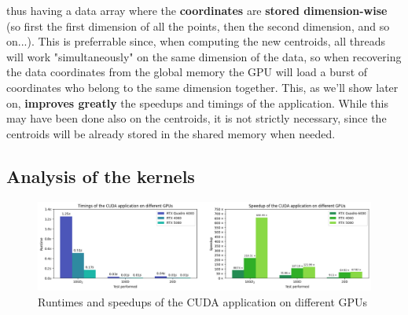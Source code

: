 \documentclass[11pt, journal]{IEEEtran}
\newcommand{\nwl}{

\vspace{11pt}

}
\begin{document}
\begin{center}
\end{center}

\nwl
thus having a data array where the \textbf{coordinates} are \textbf{stored dimension-wise} (so first the first dimension of all the points, then the second dimension, and so on...). This is preferrable since, when computing the new centroids, all threads will work "simultaneously" on the same dimension of the data, so when recovering the data coordinates from the global memory the GPU will load a burst of coordinates who belong to the same dimension together. This, as we'll show later on, \textbf{improves greatly} the speedups and timings of the application. While this may have been done also on the centroids, it is not strictly necessary, since the centroids will be already stored in the shared memory when needed.

\subsection{Analysis of the kernels}

\begin{figure}
    \label{cuda_runtimes_speedups}
    \centering
    \includegraphics[width=\linewidth]{imgs/cuda_timings_speedups.png}
    \caption{Runtimes and speedups of the CUDA application on different GPUs}
\end{figure}
\end{document}

